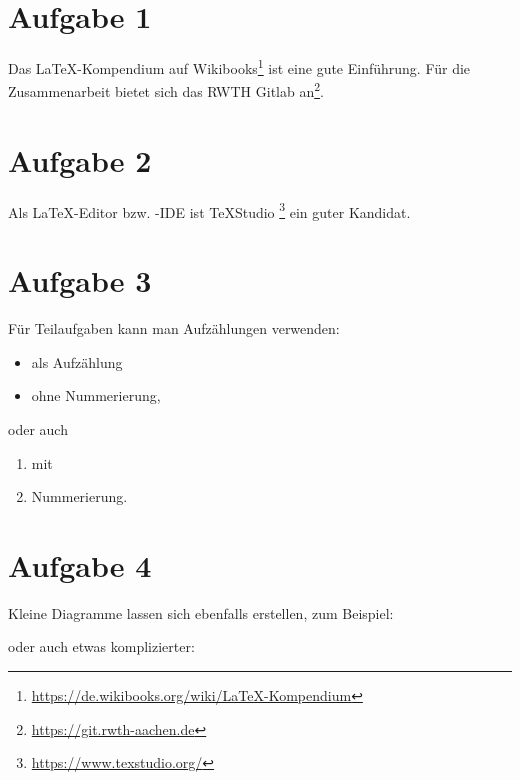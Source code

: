\documentclass{../template}
\begin{document}
	

	
	
	\section*{Aufgabe 1}
	
	Das \LaTeX{}-Kompendium auf Wikibooks\footnote{\url{https://de.wikibooks.org/wiki/LaTeX-Kompendium}} ist eine gute Einführung.
	Für die Zusammenarbeit bietet sich das RWTH Gitlab an\footnote{\url{https://git.rwth-aachen.de}}.
	
	
	\section*{Aufgabe 2}
	
	Als \LaTeX{}-Editor bzw. -IDE ist TeXStudio \footnote{\url{https://www.texstudio.org/}} ein guter Kandidat.
	

	
	\section*{Aufgabe 3}
	
		Für Teilaufgaben kann man Aufzählungen verwenden:
	\begin{itemize}
		\item als Aufzählung
		\item ohne Nummerierung,
	\end{itemize}
	oder auch
	\begin{enumerate}
		\item mit
		\item Nummerierung.
	\end{enumerate}
	
	\section*{Aufgabe 4}
	
	Kleine Diagramme lassen sich ebenfalls erstellen, zum Beispiel:
	
	\begin{center}
	\end{center}
	
	oder auch etwas komplizierter:
	
\end{document}
